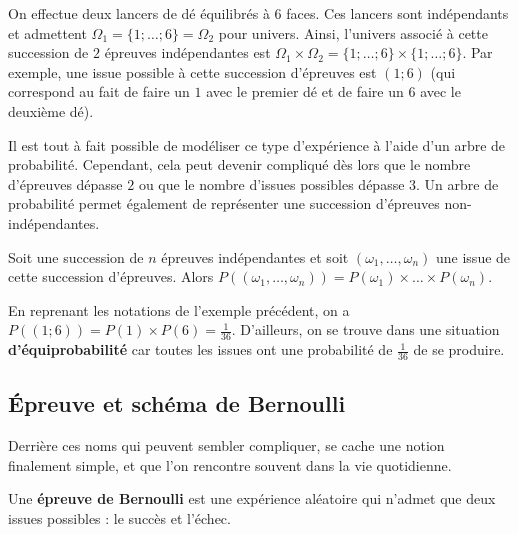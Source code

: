 	\begin{tip}[Exemple]
		On effectue deux lancers de dé équilibrés à $6$ faces. Ces lancers sont indépendants et admettent $\Omega_1 = \{1; \dots; 6\} = \Omega_2$ pour univers.
		\newpar
		Ainsi, l'univers associé à cette succession de $2$ épreuves indépendantes est $\Omega_1 \times \Omega_2 = \{1; \dots; 6\} \times \{1; \dots; 6\}$.
		\newpar
		Par exemple, une issue possible à cette succession d'épreuves est $(1; 6)$ (qui correspond au fait de faire un $1$ avec le premier dé et de faire un $6$ avec le deuxième dé).
	\end{tip}

	\begin{tip}
		Il est tout à fait possible de modéliser ce type d'expérience à l'aide d'un arbre de probabilité. Cependant, cela peut devenir compliqué dès lors que le nombre d'épreuves dépasse $2$ ou que le nombre d'issues possibles dépasse $3$.
		\newpar
		Un arbre de probabilité permet également de représenter une succession d'épreuves non-indépendantes.
	\end{tip}

	\begin{formula}
		Soit une succession de $n$ épreuves indépendantes et soit $(\omega_1, \dots, \omega_n)$ une issue de cette succession d'épreuves. Alors $P((\omega_1, \dots, \omega_n)) = P(\omega_1) \times \dots \times P(\omega_n)$.
	\end{formula}

	\begin{tip}[Exemple]
		En reprenant les notations de l'exemple précédent, on a $P((1; 6)) = P(1) \times P(6) = \frac{1}{36}$.
		\newpar
		D'ailleurs, on se trouve dans une situation \textbf{d'équiprobabilité} car toutes les issues ont une probabilité de $\frac{1}{36}$ de se produire.
	\end{tip}

	\subsection{Épreuve et schéma de Bernoulli}

	Derrière ces noms qui peuvent sembler compliquer, se cache une notion finalement simple, et que l'on rencontre souvent dans la vie quotidienne.

	\begin{formula}
		Une \textbf{épreuve de Bernoulli} est une expérience aléatoire qui n'admet que deux issues possibles : le succès et l'échec.
	\end{formula}

